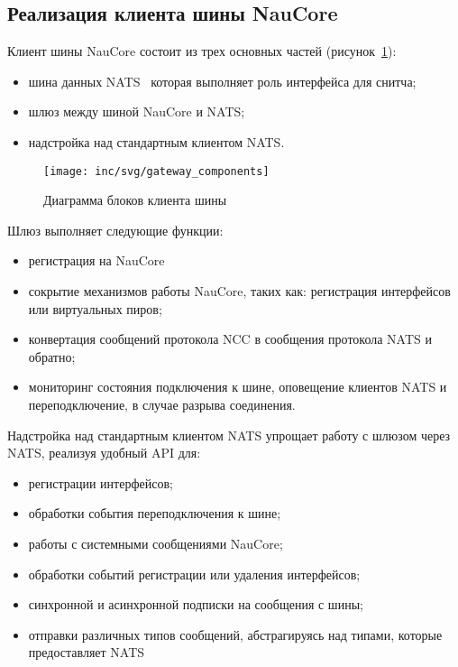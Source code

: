 \subsection{Реализация клиента шины NauCore}

Клиент шины NauCore состоит из трех основных частей (рисунок~\ref{pic:gateway:components}):
\begin{itemize}
    \item шина данных NATS~%
    которая выполняет роль интерфейса для снитча; %
    \item шлюз между шиной NauCore и NATS;
    \item надстройка над стандартным клиентом NATS\@.
\end{itemize}

\begin{figure}[ht]
    \centering
    \texttt{[image: inc/svg/gateway\_components]}
    \caption{Диаграмма блоков клиента шины}
    \label{pic:gateway:components}
\end{figure}

Шлюз выполняет следующие функции:
\begin{itemize}
    \item регистрация на NauCore
    \item сокрытие механизмов работы NauCore, таких как: регистрация интерфейсов или виртуальных пиров;
    \item конвертация сообщений протокола NCC в сообщения протокола NATS и обратно; %
    \item мониторинг состояния подключения к шине, оповещение клиентов NATS и переподключение, в случае разрыва соединения. %
\end{itemize}


Надстройка над стандартным клиентом NATS упрощает работу с шлюзом через NATS,
реализуя удобный API для:
\begin{itemize}
    \item регистрации интерфейсов;
    \item обработки события переподключения к шине;
    \item работы с системными сообщениями NauCore;
    \item обработки событий регистрации или удаления интерфейсов;
    \item синхронной и асинхронной подписки на сообщения с шины;
    \item отправки различных типов сообщений, абстрагируясь над типами, которые предоставляет NATS\@
\end{itemize}

